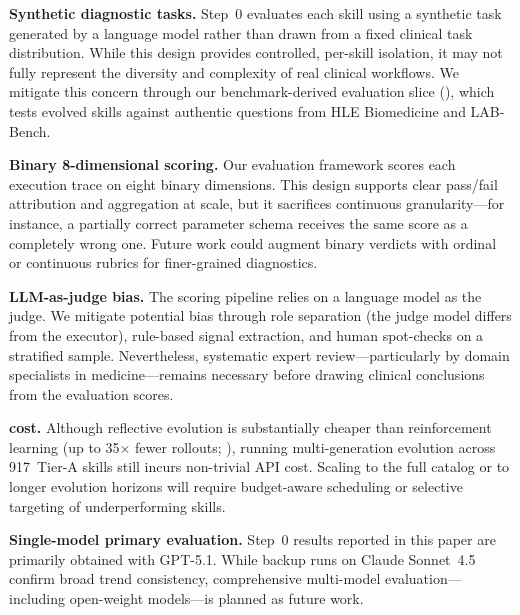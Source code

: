 \label{sec:limitations}

\noindent
\textbf{Synthetic diagnostic tasks.}\quad
Step~0 evaluates each skill using a synthetic task generated by a language model rather than drawn from a fixed clinical task distribution.
While this design provides controlled, per-skill isolation, it may not fully represent the diversity and complexity of real clinical workflows.
We mitigate this concern through our benchmark-derived evaluation slice (), which tests evolved skills against authentic questions from HLE Biomedicine and LAB-Bench.

\textbf{Binary 8-dimensional scoring.}\quad
Our evaluation framework scores each execution trace on eight binary dimensions.
This design supports clear pass/fail attribution and aggregation at scale, but it sacrifices continuous granularity---for instance, a partially correct parameter schema receives the same score as a completely wrong one.
Future work could augment binary verdicts with ordinal or continuous rubrics for finer-grained diagnostics.

\textbf{LLM-as-judge bias.}\quad
The scoring pipeline relies on a language model as the judge.
We mitigate potential bias through role separation (the judge model differs from the executor), rule-based signal extraction, and human spot-checks on a stratified sample.
Nevertheless, systematic expert review---particularly by domain specialists in medicine---remains necessary before drawing clinical conclusions from the evaluation scores.

\textbf{\gepamed cost.}\quad
Although reflective evolution is substantially cheaper than reinforcement learning (up to 35$\times$ fewer rollouts; \citealp{gepa2025}), running multi-generation evolution across 917~Tier-A skills still incurs non-trivial API cost.
Scaling \gepamed to the full catalog or to longer evolution horizons will require budget-aware scheduling or selective targeting of underperforming skills.

\textbf{Single-model primary evaluation.}\quad
Step~0 results reported in this paper are primarily obtained with GPT-5.1.
While backup runs on Claude Sonnet~4.5 confirm broad trend consistency, comprehensive multi-model evaluation---including open-weight models---is planned as future work.
